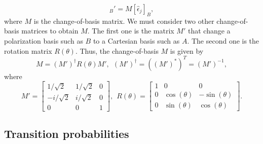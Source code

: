 \begin{equation}
    [\hat{\epsilon}_j]_B' = M [\hat{\epsilon}_j]_B,
\end{equation}
where $ M $ is the change-of-basis matrix. We must consider two other change-of-basis matrices to obtain $ M $. The first one is the matrix $ M' $ that change a polarization basis such as $ B $ to a Cartesian basis such as $ A $. The second one is the rotation matrix $ R(\theta) $. Thus, the change-of-basis $ M $ is given by
\begin{equation}
    M = (M')^{\dagger}R(\theta)M',\ \ (M')^{\dagger} = ((M')^*)^T = (M')^{-1},
\end{equation}
where
\begin{equation}
    M' = \left[ \begin{matrix}
        1/\sqrt{2} & 1/\sqrt{2} & 0 \\
        -i/\sqrt{2} & i/\sqrt{2} & 0 \\
        0 & 0 & 1
    \end{matrix} \right],\ \
    R(\theta) = \left[ \begin{matrix}
        1 & 0 & 0 \\
        0 & \cos(\theta) & -\sin(\theta) \\
        0 & \sin(\theta) & \cos(\theta)
    \end{matrix} \right].
\end{equation}

\subsection{Transition probabilities}
\label{sec:transition-probabilities}


